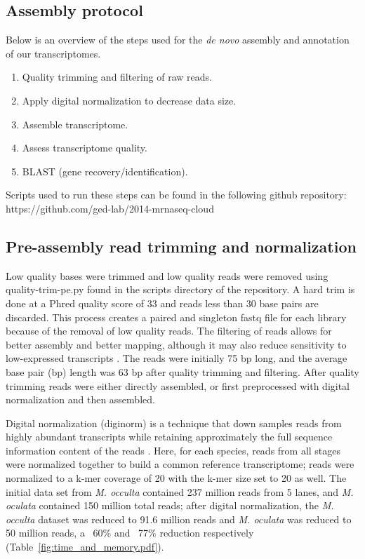 \documentclass[fleqn,10pt]{wlpeerj}
\begin{document}
\subsection{Assembly protocol}
Below is an overview of the steps used for the \textit{de novo} assembly and annotation of our transcriptomes.
\begin{enumerate}[noitemsep] 
\item Quality trimming and filtering of raw reads.
\item Apply digital normalization to decrease data size.
\item Assemble transcriptome.
\item Assess transcriptome quality.
\item BLAST (gene recovery/identification).
\end{enumerate}
Scripts used to run these steps can be found in the following github repository: https://github.com/ged-lab/2014-mrnaseq-cloud
\subsection{Pre-assembly read trimming and normalization} 
Low quality bases were trimmed and low quality reads were removed using quality-trim-pe.py found in the scripts directory of the repository. A hard trim is done at a Phred quality score of 33 and reads less than 30 base pairs are discarded. This process creates a paired and singleton fastq file for each library because of the removal of low quality reads. The filtering of reads allows for better assembly and better mapping, although it may also reduce sensitivity to low-expressed transcripts \citep{lohse_robina:_2012, macmanes_optimal_2014}. The reads were initially 75 bp long, and the average base pair (bp) length was 63 bp after quality trimming and filtering. After quality trimming reads were either directly assembled, or first preprocessed with digital normalization and then assembled. 

Digital normalization (diginorm) is a technique that down samples reads from highly abundant transcripts while retaining approximately the full sequence information content of the reads \citep{brown_reference-free_2012}. Here, for each species, reads from all stages were normalized together to build a common reference transcriptome; reads were normalized to a k-mer coverage of 20 with the k-mer size set to 20 as well.  The initial data set from \textit{M. occulta} contained 237 million reads from 5 lanes, and \textit{M. oculata} contained 150 million total reads; after digital normalization, the \textit{M. occulta} dataset was reduced to 91.6 million reads and \textit{M. oculata} was reduced to 50 million reads, a ~60\% and ~77\% reduction respectively (Table~\ref{fig:time_and_memory.pdf}).
\end{document}
